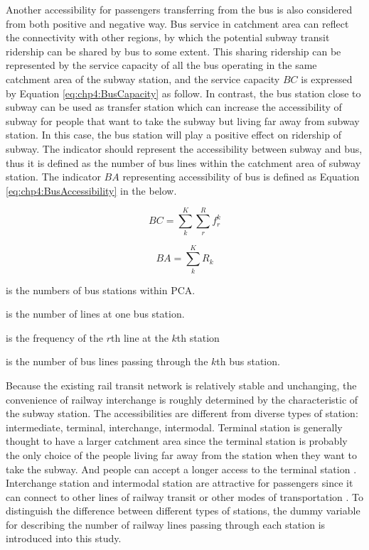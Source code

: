 %
Another accessibility for passengers transferring from the bus is also considered from both positive and negative way. Bus service in catchment area can reflect the connectivity with other regions, by which the potential subway transit ridership can be shared by bus to some extent. This sharing ridership can be represented by the service capacity of all the bus operating in the same catchment area of the subway station, and the service capacity $BC$ is expressed by Equation \ref{eq:chp4:BusCapacity} as follow. In contrast, the bus station close to subway can be used as transfer station which can increase the accessibility of subway for people that want to take the subway but living far away from subway station. In this case, the bus station will play a positive effect on ridership of subway. The indicator should represent the accessibility between subway and bus, thus it is defined as the number of bus lines within the catchment area of subway station. The indicator $BA$ representing accessibility of bus is defined as Equation \ref{eq:chp4:BusAccessibility} in the below.

\begin{equation}
BC=\sum_{k}^{K}\sum_{r}^{R}f_{r}^{k}
\label{eq:chp4:BusCapacity}
\end{equation}

\begin{equation}
BA=\sum_{k}^{K}R_{k}
\label{eq:chp4:BusAccessibility}
\end{equation}

\begin{description}
	\setlength{\parskip}{0\baselineskip} %
	\normalsize
	\item[\textbf{Where:}]
	\item[$K$] is the numbers of bus stations within PCA.
	\item[$R$] is the number of lines at one bus station.
	\item[$f_{r}^{k}$] is the frequency of the $r$th line at the $k$th station
	\item[$R_k$] is the number of bus lines passing through the $k$th bus station.
	\setlength{\parskip}{0.7\baselineskip} %
\end{description}

%
Because the existing rail transit network is relatively stable and unchanging, the convenience of railway interchange is roughly determined by the characteristic of the subway station. The accessibilities are different from diverse types of station: intermediate, terminal, interchange, intermodal. Terminal station is generally thought to have a larger catchment area since the terminal station is probably the only choice of the people living far away from the station when they want to take the subway. And people can accept a longer access to the terminal station \cite{o1996walking}. Interchange station and intermodal station are attractive for passengers since it can connect to other lines of railway transit or other modes of transportation \cite{kuby2004factors}. To distinguish the difference between different types of stations, the dummy variable for describing the number of railway lines passing through each station is introduced into this study.

